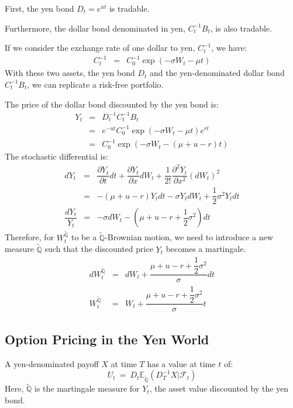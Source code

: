 \documentclass[uplatex,a4j,12pt,dvipdfmx]{jsarticle}
\begin{document}
First, the yen bond $D_{t} = e^{ut}$ is tradable.

Furthermore, the dollar bond denominated in yen, $C^{-1}_{t} B_{t}$, is also tradable.

If we consider the exchange rate of one dollar to yen, $C^{-1}_{t}$, we have:
%
%
\begin{eqnarray*}
	C^{-1}_{t}
	&=&
	C_{0}^{-1}
	\exp ( - \sigma W_{t} - \mu t )
\end{eqnarray*}
%
%
With these two assets, the yen bond $D_{t}$ and the yen-denominated dollar bond $C^{-1}_{t} B_{t}$, we can replicate a risk-free portfolio.

The price of the dollar bond discounted by the yen bond is:
%
%
\begin{eqnarray*}
	Y_{t}
	&=&
	D^{-1}_{t}
	C^{-1}_{t}
	B_{t}
	\\ &=&
	e^{-ut}
	C_{0}^{-1}
	\exp ( - \sigma W_{t} - \mu t )
	e^{rt}
	\\ &=&
	C_{0}^{-1}
	\exp ( - \sigma W_{t} - (\mu + u -r) t )
\end{eqnarray*}
%
%
The stochastic differential is:
%
%
\begin{eqnarray*}
	d Y_{t}
	&=&
	\dfrac{\partial Y_{t}}{\partial t} dt
	+
	\dfrac{\partial Y_{t}}{\partial x} dW_{t}
	+
	\dfrac{1}{2!}
	\dfrac{\partial^{2} Y_{t}}{\partial x^{2}} (dW_{t})^{2}
	\\ &=&
	- (\mu + u -r) Y_{t} dt
	- \sigma Y_{t} d W_{t}
	+ \dfrac{1}{2} \sigma^{2} Y_{t} dt
	\\[3mm]
	\dfrac{dY_{t}}{Y_{t}}
	&=&
	- \sigma d W_{t}
	- \left( \mu + u -r + \dfrac{1}{2} \sigma^{2} \right) dt
\end{eqnarray*}
%
%
Therefore, for $W^{\tilde{\mathbb{Q}}}_{t}$ to be a $\tilde{\mathbb{Q}}$-Brownian motion, we need to introduce a new measure $\tilde{\mathbb{Q}}$ such that the discounted price $Y_{t}$ becomes a martingale.
%
%
\begin{eqnarray*}
	d W^{\tilde{\mathbb{Q}}}_{t}
	&=&
	d W_{t}
	+
	\dfrac{\mu + u -r + \dfrac{1}{2} \sigma^{2}}{\sigma} dt
	\\
	W^{\tilde{\mathbb{Q}}}_{t}
	&=&
	W_{t}
	+
	\dfrac{\mu + u -r + \dfrac{1}{2} \sigma^{2}}{\sigma} t
\end{eqnarray*}
%
%
\subsection*{Option Pricing in the Yen World}

A yen-denominated payoff $X$ at time $T$ has a value at time $t$ of:
$$
	U_{t}
	\ = \
	D_{t}
	\mathbb{E}_{\tilde{\mathbb{Q}}}
	( D^{-1}_{T} X | \mathcal{F}_{t} )
$$
Here, $\tilde{\mathbb{Q}}$ is the martingale measure for $Y_{t}$, the asset value discounted by the yen bond.
\end{document}
